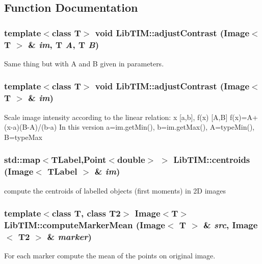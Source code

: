 \subsection{Function Documentation}
\subsubsection{\setlength{\rightskip}{0pt plus 5cm}template$<$class T$>$ void Lib\-TIM::adjust\-Contrast (Image$<$ T $>$ \& {\em im}, T {\em A}, T {\em B})}\label{group__misc_ga1}


Same thing but with A and B given in parameters. 

\subsubsection{\setlength{\rightskip}{0pt plus 5cm}template$<$class T$>$ void Lib\-TIM::adjust\-Contrast (Image$<$ T $>$ \& {\em im})}\label{group__misc_ga0}


Scale image intensity according to the linear relation: x  [a,b], f(x)  [A,B] f(x)=A+(x-a)(B-A)/(b-a) In this version a=im.get\-Min(), b=im.get\-Max(), A=type\-Min(), B=type\-Max 
\subsubsection{\setlength{\rightskip}{0pt plus 5cm}std::map$<${\bf TLabel},Point$<$double$>$ $>$ Lib\-TIM::centroids (Image$<$ {\bf TLabel} $>$ \& {\em im})\hspace{0.3cm}{\tt  [inline]}}\label{group__misc_ga5}


compute the centroids of labelled objects (first moments) in 2D images 

\subsubsection{\setlength{\rightskip}{0pt plus 5cm}template$<$class T, class T2$>$ Image$<$T$>$ Lib\-TIM::compute\-Marker\-Mean (Image$<$ T $>$ \& {\em src}, Image$<$ T2 $>$ \& {\em marker})}\label{group__misc_ga2}


For each marker compute the mean of the points on original image. 

